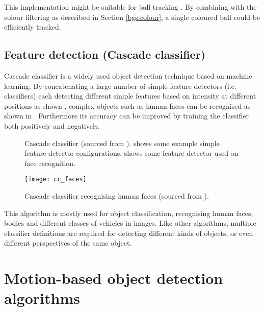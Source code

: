 This implementation might be suitable for ball tracking . By combining with the colour filtering as described in Section \ref{bgs:colour}, a single coloured ball could be efficiently tracked.

\subsection{Feature detection (Cascade classifier)}
\label{sec:bg:cc}


Cascade classifier \cite{cascade} \cite{viola2001rapid} is a widely used object detection technique based on machine learning. By concatenating a large number of simple feature detectors (i.e. classifiers) each detecting different simple features based on  intensity at different positions as shown  , complex objects such as human faces can be recognised as shown in . Furthermore\mdc{,} its accuracy can be improved by training the classifier both positively and negatively.

\begin{figure}[H]
  \centering
  \caption{Cascade classifier (sourced from \cite{borovicka2003circle}).  shows some example simple feature detector configurations,  shows some feature detector used on face recognition.}
  \label{bg:cc}
\end{figure}

\begin{figure}[H]
  \centering
  \texttt{[image: cc\_faces]}
  \caption{Cascade classifier recognising human faces (sourced from \cite{borovicka2003circle}).}
  \label{bg:cc:faces}
\end{figure}

This algorithm is mostly used for object classification,  recognising human faces, bodies and different classes of vehicles in images. Like other  algorithms, multiple classifier definitions are required for detecting different kinds of objects, or even different perspectives of the same object.


\section{Motion-based object detection algorithms}

